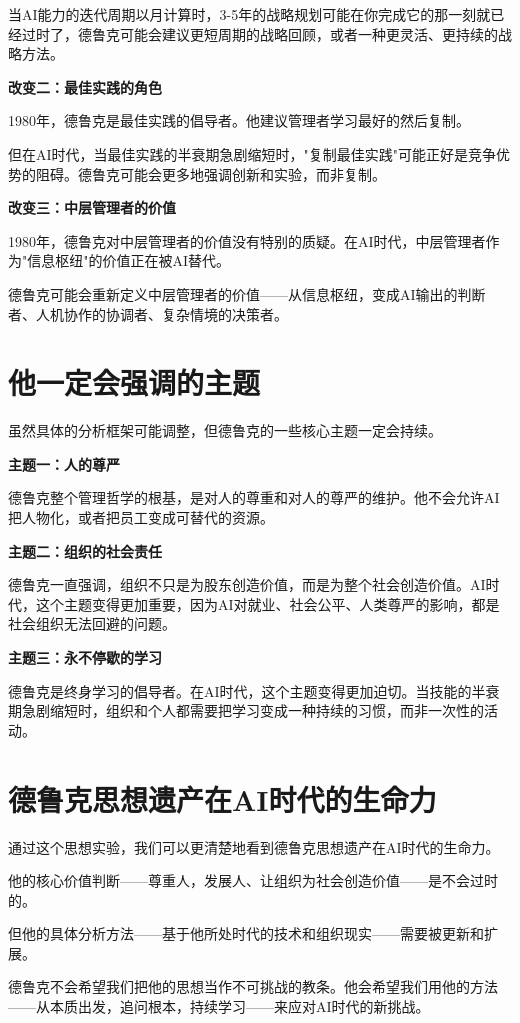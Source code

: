 当AI能力的迭代周期以月计算时，3-5年的战略规划可能在你完成它的那一刻就已经过时了，德鲁克可能会建议更短周期的战略回顾，或者一种更灵活、更持续的战略方法。

\textbf{改变二：最佳实践的角色}

1980年，德鲁克是最佳实践的倡导者。他建议管理者学习最好的然后复制。

但在AI时代，当最佳实践的半衰期急剧缩短时，"复制最佳实践"可能正好是竞争优势的阻碍。德鲁克可能会更多地强调创新和实验，而非复制。

\textbf{改变三：中层管理者的价值}

1980年，德鲁克对中层管理者的价值没有特别的质疑。在AI时代，中层管理者作为"信息枢纽"的价值正在被AI替代。

德鲁克可能会重新定义中层管理者的价值——从信息枢纽，变成AI输出的判断者、人机协作的协调者、复杂情境的决策者。

\section{他一定会强调的主题}


虽然具体的分析框架可能调整，但德鲁克的一些核心主题一定会持续。

\textbf{主题一：人的尊严}

德鲁克整个管理哲学的根基，是对人的尊重和对人的尊严的维护。他不会允许AI把人物化，或者把员工变成可替代的资源。

\textbf{主题二：组织的社会责任}

德鲁克一直强调，组织不只是为股东创造价值，而是为整个社会创造价值。AI时代，这个主题变得更加重要，因为AI对就业、社会公平、人类尊严的影响，都是社会组织无法回避的问题。

\textbf{主题三：永不停歇的学习}

德鲁克是终身学习的倡导者。在AI时代，这个主题变得更加迫切。当技能的半衰期急剧缩短时，组织和个人都需要把学习变成一种持续的习惯，而非一次性的活动。

\section{德鲁克思想遗产在AI时代的生命力}


通过这个思想实验，我们可以更清楚地看到德鲁克思想遗产在AI时代的生命力。

他的核心价值判断——尊重人，发展人、让组织为社会创造价值——是不会过时的。

但他的具体分析方法——基于他所处时代的技术和组织现实——需要被更新和扩展。

德鲁克不会希望我们把他的思想当作不可挑战的教条。他会希望我们用他的方法——从本质出发，追问根本，持续学习——来应对AI时代的新挑战。

